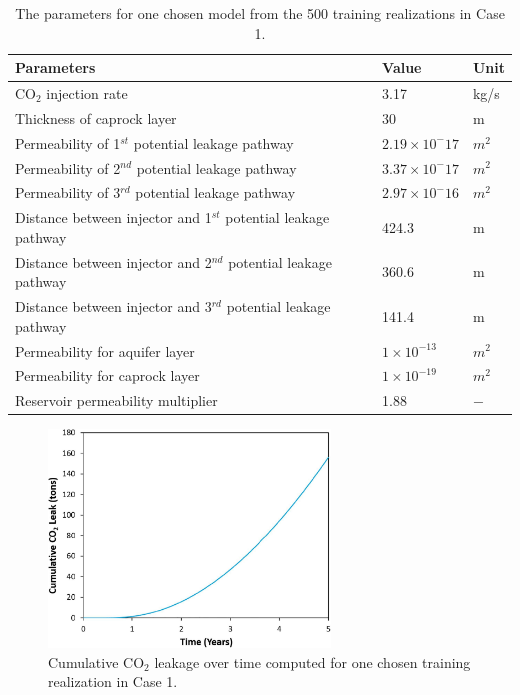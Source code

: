 \documentclass[a4paper,fleqn]{cas-sc}
\begin{document}
\begin{table}[width=.9\linewidth,cols=3,pos=h]
    \caption{The parameters for one chosen model from the 500 training realizations in Case 1.}\label{tbl:2}
    \begin{tabular*}{\tblwidth}{@{} LLL@{} }
    \toprule
    \textbf{Parameters} & \textbf{Value} & \textbf{Unit}  \\
    \midrule
    CO$_2$ injection rate & 3.17 & kg/s \\
    Thickness of caprock layer & 30 & m \\
    Permeability of 1$^{st}$ potential leakage pathway & $2.19\times 10^-{17}$ & $m^2$ \\
    Permeability of 2$^{nd}$ potential leakage pathway & $3.37\times 10^-{17}$ & $m^2$ \\
    Permeability of 3$^{rd}$ potential leakage pathway & $2.97\times 10^-{16}$ & $m^2$ \\
    Distance between injector and 1$^{st}$ potential leakage pathway & 424.3 & m \\
    Distance between injector and 2$^{nd}$ potential leakage pathway & 360.6 & m \\
    Distance between injector and 3$^{rd}$ potential leakage pathway & 141.4 & m \\
    Permeability for aquifer layer & $1\times 10^{-13}$ & $m^2$ \\
    Permeability for caprock layer & $1\times 10^{-19}$ & $m^2$  \\
    Reservoir permeability multiplier & 1.88 & $-$   \\  
    \bottomrule
    \end{tabular*}
\end{table}

\begin{figure}
    \centering
    \includegraphics[width=7.5cm]{figs/Figure 8.pdf}
    \caption{Cumulative CO$_2$ leakage over time computed for one chosen training realization in Case 1.}
    \label{cum_leak_line}
\end{figure}
\end{document}
